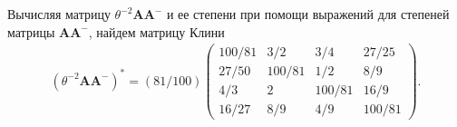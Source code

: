 \documentclass[specialist,
               substylefile = spbu.rtx,
               subf,href,colorlinks=true, 12pt]{disser}
\theoremstyle{definition}
\begin{document}
Вычисляя матрицу $\theta^{-2}\bm{A}\bm{A}^{-}$ и ее степени при помощи выражений для степеней матрицы $\bm{A}\bm{A}^{-}$, найдем матрицу Клини 
\begin{gather*}
(\theta^{-2}\bm{A}\bm{A}^{-})^{\ast}
=
(81/100)
\begin{pmatrix}
100/81 & 3/2 &3/4 &27/25\\
27/50 &100/81 &1/2 &8/9\\
4/3 &2 &100/81 &16/9\\
16/27 &8/9 &4/9 &100/81
\end{pmatrix}.%
\end{gather*}

%
\end{document}
